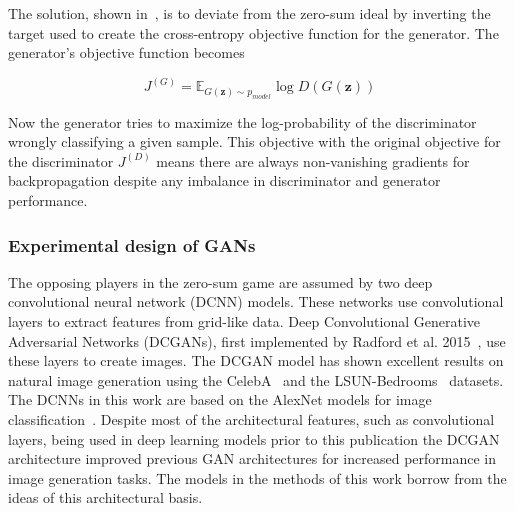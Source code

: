 \documentclass[twocolumn]{article}
\numberwithin{equation}{section}
\begin{document}
The solution, shown in~\cite{gf_gan}, is to deviate from the zero-sum ideal by inverting the target used to create the 
cross-entropy objective function for the generator. The generator's objective function becomes

\begin{equation}\label{eqn:J_G}
    J^{(G)} = \mathbb{E}_{G(\mathbf{z}) \sim p_{model}} \log D(G(\mathbf{z}))  
\end{equation}

Now the generator tries to maximize the log-probability of the discriminator wrongly classifying a given sample. This 
objective with the original objective for the discriminator $J^{(D)}$ means there are always non-vanishing gradients for 
backpropagation despite any imbalance in discriminator and generator performance. 


\subsubsection{Experimental design of GANs} 
The opposing players in the zero-sum game are assumed by two deep convolutional neural network (DCNN) models. These 
networks use convolutional layers to extract features from grid-like data. Deep Convolutional Generative Adversarial 
Networks (DCGANs), first implemented by Radford et al. 2015~\cite{dcgan}, use these layers to create images. The DCGAN 
model has shown excellent results on natural image generation using the CelebA~\cite{celebA} and the 
LSUN-Bedrooms~\cite{LSUN} datasets. The DCNNs in this work are based on the AlexNet models for image 
classification~\cite{dcnn}. Despite most of the architectural features, such as convolutional layers, being used in deep 
learning models prior to this publication the DCGAN architecture improved previous GAN architectures for increased 
performance in image generation tasks. The models in the methods of this work borrow from the ideas of this architectural 
basis.

\end{document}

